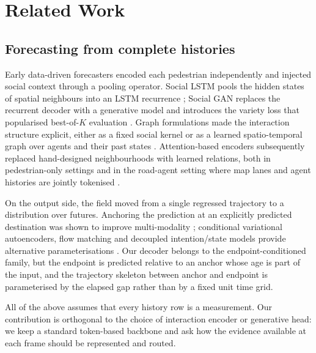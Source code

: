\section{Related Work}
\label{sec:related}

\subsection{Forecasting from complete histories}
Early data-driven forecasters encoded each pedestrian independently and injected social context through a pooling operator. Social LSTM pools the hidden states of spatial neighbours into an LSTM recurrence \cite{alahi2016social}; Social GAN replaces the recurrent decoder with a generative model and introduces the variety loss that popularised best-of-$K$ evaluation \cite{gupta2018social}. Graph formulations made the interaction structure explicit, either as a fixed social kernel \cite{mohamed2020social} or as a learned spatio-temporal graph over agents and their past states \cite{salzmann2020trajectron,kosaraju2020social}. Attention-based encoders subsequently replaced hand-designed neighbourhoods with learned relations, both in pedestrian-only settings \cite{yuan2021agentformer} and in the road-agent setting where map lanes and agent histories are jointly tokenised \cite{liang2020lane,gao2020vectornet,ngiam2022scene,shi2022motion,nayakanti2022wayformer}.

On the output side, the field moved from a single regressed trajectory to a distribution over futures. Anchoring the prediction at an explicitly predicted destination was shown to improve multi-modality \cite{mangalam2020not}; conditional variational autoencoders, flow matching and decoupled intention/state models provide alternative parameterisations \cite{fu2025moflow,zhang2024demo}. Our decoder belongs to the endpoint-conditioned family, but the endpoint is predicted relative to an anchor whose age is part of the input, and the trajectory skeleton between anchor and endpoint is parameterised by the elapsed gap rather than by a fixed unit time grid.

All of the above assumes that every history row is a measurement. Our contribution is orthogonal to the choice of interaction encoder or generative head: we keep a standard token-based backbone and ask how the evidence available at each frame should be represented and routed.

